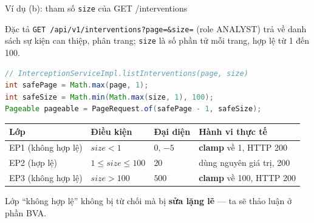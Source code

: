\documentclass[aspectratio=169,12pt]{beamer}
\begin{document}
\begin{frame}[fragile,shrink=10]{Ví dụ (b): tham số \texttt{size} của GET /interventions}
  \begin{block}{Đặc tả}
    \texttt{GET /api/v1/interventions?page=\&size=} (role ANALYST) trả về
    danh sách sự kiện can thiệp, phân trang; \texttt{size} là số phần tử
    mỗi trang, hợp lệ từ 1 đến 100.
  \end{block}

\begin{lstlisting}[language=java]
// InterceptionServiceImpl.listInterventions(page, size)
int safePage = Math.max(page, 1);
int safeSize = Math.min(Math.max(size, 1), 100);
Pageable pageable = PageRequest.of(safePage - 1, safeSize);
\end{lstlisting}

  \begin{center}
  \small
  \begin{tabular}{llll}
    \toprule
    \textbf{Lớp} & \textbf{Điều kiện} & \textbf{Đại diện} & \textbf{Hành vi thực tế} \\
    \midrule
    EP1 (không hợp lệ) & $size < 1$ & $0$, $-5$ & \textbf{clamp} về 1, HTTP 200 \\
    EP2 (hợp lệ) & $1 \leq size \leq 100$ & $20$ & dùng nguyên giá trị, 200 \\
    EP3 (không hợp lệ) & $size > 100$ & $500$ & \textbf{clamp} về 100, HTTP 200 \\
    \bottomrule
  \end{tabular}
  \end{center}

  {\small Lớp ``không hợp lệ'' không bị từ chối mà bị \textbf{sửa lặng lẽ} ---
  ta sẽ thảo luận ở phần BVA.}
\end{frame}
\end{document}

